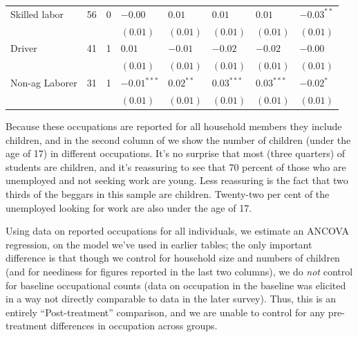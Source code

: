 \documentclass[11pt]{article}
\begin{document}
\begin{table}[htb]
\begin{tabular}{lrrlllll}
Skilled labor & 56 & 0 & $-0.00$ & $0.01$ & $0.01$ & $0.01$ & $-0.03^{**}$\\
 &  &  & $(0.01)$ & $(0.01)$ & $(0.01)$ & $(0.01)$ & $(0.01)$\\
Driver & 41 & 1 & $0.01$ & $-0.01$ & $-0.02$ & $-0.02$ & $-0.00$\\
 &  &  & $(0.01)$ & $(0.01)$ & $(0.01)$ & $(0.01)$ & $(0.01)$\\
Non-ag Laborer & 31 & 1 & $-0.01^{***}$ & $0.02^{**}$ & $0.03^{***}$ & $0.03^{***}$ & $-0.02^{*}$\\
 &  &  & $(0.01)$ & $(0.01)$ & $(0.01)$ & $(0.01)$ & $(0.01)$\\
\end{tabular}
\end{table}

Because these occupations are reported for all household members they
include children, and in the second column of  we show
the number of children (under the age of 17) in different occupations.
It's no surprise that most (three quarters) of students are children,
and it's reassuring to see that 70 percent of those who are unemployed
and not seeking work are young.  Less reassuring is the fact that
two thirds of the beggars in this sample are children.  Twenty-two per
cent of the unemployed looking for work are also under the age of 17.

Using data on reported occupations for all individuals, we estimate an
ANCOVA regression, on the model we've used in earlier tables; the only
important difference is that though we control for household size and
numbers of children (and for neediness for figures reported in the
last two columns), we do \emph{not} control for baseline occupational
counts (data on occupation in the baseline was elicited in a way not
directly comparable to data in the later survey).  Thus, this is an
entirely ``Post-treatment'' comparison, and we are unable to control for
any pre-treatment differences in occupation across groups.
\end{document}
